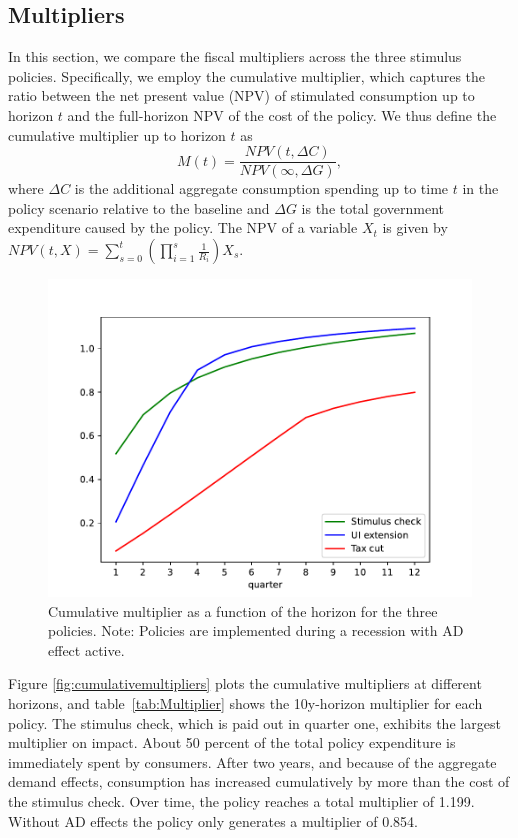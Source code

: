 \documentclass[\econtexRoot/HAFiscal]{subfiles}
\begin{document}
\hypertarget{multipliers}{}\par\subsection{Multipliers}
\notinsubfile{\label{sec:multipliers}}

In this section, we compare the fiscal multipliers across the three stimulus policies. Specifically, we employ the cumulative multiplier, which captures the ratio between the net present value (NPV) of stimulated consumption up to horizon $t$ and the full-horizon NPV of the cost of the policy. We thus define the cumulative multiplier up to horizon $t$ as
\begin{equation*}
  M(t) = \frac{NPV(t,\Delta C)}{NPV (\infty,\Delta G)},
\end{equation*}
where $\Delta C$ is the additional aggregate consumption spending up to time $t$ in the policy scenario relative to the baseline and $\Delta G$ is the total government expenditure caused by the policy. The NPV of a variable $X_t$ is given by 
$NPV(t,X) = \sum_{s=0}^{t} \left( \prod_{i=1}^{s} \frac{1}{R_i} \right) X_s$. 

\begin{figure}[t]
  \centering
  \includegraphics[width=0.8\linewidth]{Code/HA-Models/FromPandemicCode/Figures/Cummulative_multipliers}
  \caption{Cumulative multiplier as a function of the horizon for the three policies. Note: Policies are implemented during a recession with AD effect active.}
  \notinsubfile{\label{fig:cumulativemultipliers}}
\end{figure}

Figure \ref{fig:cumulativemultipliers} plots the cumulative multipliers at different horizons, and table~\ref{tab:Multiplier} shows the 10y-horizon multiplier for each policy. The stimulus check, which is paid out in quarter one, exhibits the largest multiplier on impact. About 50 percent of the total policy expenditure is immediately spent by consumers. After two years, and because of the aggregate demand effects, consumption has increased cumulatively by more than the cost of the stimulus check. Over time, the policy reaches a total multiplier of 1.199. Without AD effects the policy only generates a multiplier of 0.854.
\end{document}
